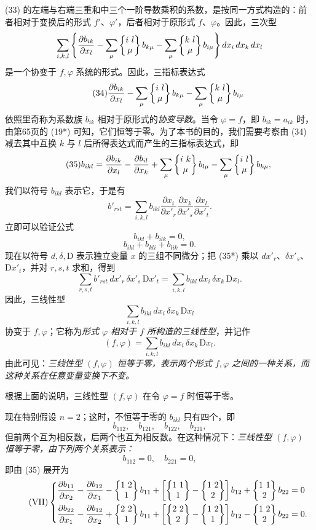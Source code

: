 (33) 的左端与右端三重和中三个一阶导数乘积的系数，是按同一方式构造的：前者相对于变换后的形式 $f'$、$\varphi'$，后者相对于原形式 $f$、$\varphi$。因此，三次型
\[
\sum_{i,k,l}\left\{\frac{\partial b_{ik}}{\partial x_l}-\sum_\mu\left\{\begin{matrix}i\ l\\ \mu\end{matrix}\right\}b_{k\mu}-\sum_\mu\left\{\begin{matrix}k\ l\\ \mu\end{matrix}\right\}b_{i\mu}\right\}dx_i\,dx_k\,dx_l
\]
是一个协变于 $f,\varphi$ 系统的形式。因此，三指标表达式
\begin{equation}\tag{34}
\frac{\partial b_{ik}}{\partial x_l}-\sum_\mu\left\{\begin{matrix}i\ l\\ \mu\end{matrix}\right\}b_{k\mu}-\sum_\mu\left\{\begin{matrix}k\ l\\ \mu\end{matrix}\right\}b_{i\mu}
\end{equation}
依照里奇称为系数族 $b_{ik}$ 相对于原形式的\emph{协变导数}。当令 $\varphi=f$，即 $b_{ik}=a_{ik}$ 时，由第65页的 (19*) 可知，它们恒等于零。为了本书的目的，我们需要考察由 (34) 减去其中互换 $k$ 与 $l$ 后所得表达式而产生的三指标表达式，即
\begin{equation}\tag{35}
b_{ikl}=\frac{\partial b_{ik}}{\partial x_l}-\frac{\partial b_{il}}{\partial x_k}+\sum_\mu\left\{\begin{matrix}i\ k\\ \mu\end{matrix}\right\}b_{l\mu}-\sum_\mu\left\{\begin{matrix}i\ l\\ \mu\end{matrix}\right\}b_{k\mu},
\end{equation}
我们以符号 $b_{ikl}$ 表示它，于是有
\begin{equation}\tag{35*}
b'_{rst}=\sum_{i,k,l} b_{ikl}\frac{\partial x_i}{\partial x'_r}\frac{\partial x_k}{\partial x'_s}\frac{\partial x_l}{\partial x'_t}.
\end{equation}
立即可以验证公式
\[
b_{ikl}+b_{ilk}=0,
\]
\[
b_{ikl}+b_{kli}+b_{lik}=0.
\]
现在以符号 $d,\delta,\mathrm D$ 表示独立变量 $x$ 的三组不同微分；把 (35*) 乘以 $dx'_r$、$\delta x'_s$、$\mathrm D x'_t$，并对 $r,s,t$ 求和，得到
\[
\sum_{r,s,t}b'_{rst}\,dx'_r\,\delta x'_s\,\mathrm D x'_t
=\sum_{i,k,l}b_{ikl}\,dx_i\,\delta x_k\,\mathrm D x_l.
\]
因此，三线性型
\[
\sum_{i,k,l}b_{ikl}\,dx_i\,\delta x_k\,\mathrm D x_l
\]
协变于 $f,\varphi$；它称为\emph{形式 $\varphi$ 相对于 $f$ 所构造的三线性型}，并记作
\[
(f,\varphi)=\sum_{i,k,l}b_{ikl}\,dx_i\,\delta x_k\,\mathrm D x_l.
\]
由此可见：\emph{三线性型 $(f,\varphi)$ 恒等于零，表示两个形式 $f,\varphi$ 之间的一种关系，而这种关系在任意变量变换下不变。}

根据上面的说明，三线性型 $(f,\varphi)$ 在令 $\varphi=f$ 时恒等于零。

现在特别假设 $n=2$；这时，不恒等于零的 $b_{ikl}$ 只有四个，即
\[
b_{112},\quad b_{121},\quad b_{122},\quad b_{221},
\]
但前两个互为相反数，后两个也互为相反数。在这种情况下：\emph{三线性型 $(f,\varphi)$ 恒等于零，由下列两个关系表示：}
\[
b_{112}=0,\quad b_{221}=0,
\]
即由 (35) 展开为
\begin{equation}\tag{VII}
\left\{
\begin{aligned}
\frac{\partial b_{11}}{\partial x_2}-\frac{\partial b_{12}}{\partial x_1}-\left\{\begin{matrix}1\ 2\\ 1\end{matrix}\right\}b_{11}
+\left[\left\{\begin{matrix}1\ 1\\ 1\end{matrix}\right\}-\left\{\begin{matrix}1\ 2\\ 2\end{matrix}\right\}\right]b_{12}+\left\{\begin{matrix}1\ 1\\ 2\end{matrix}\right\}b_{22}&=0\\
\frac{\partial b_{22}}{\partial x_1}-\frac{\partial b_{12}}{\partial x_2}+\left\{\begin{matrix}2\ 2\\ 1\end{matrix}\right\}b_{11}
+\left[\left\{\begin{matrix}2\ 2\\ 2\end{matrix}\right\}-\left\{\begin{matrix}1\ 2\\ 1\end{matrix}\right\}\right]b_{12}-\left\{\begin{matrix}1\ 2\\ 2\end{matrix}\right\}b_{22}&=0.
\end{aligned}
\right.
\end{equation}

